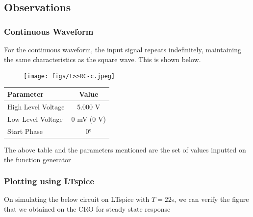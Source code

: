 \documentclass[journal]{IEEEtran}
\begin{document}
\subsection{Observations}
\subsubsection{Continuous Waveform}

For the continuous waveform, the input signal repeats indefinitely, maintaining the same characteristics as the square wave. This is shown below.

\begin{figure}[H]
    \centering
    \texttt{[image: figs/t>>RC-c.jpeg]}
\end{figure}
\begin{table}[h]
    \centering
    \renewcommand{\arraystretch}{1.3} %
    \begin{tabular}{|l|c|}
        \hline
        \textbf{Parameter} & \textbf{Value} \\
        \hline
        High Level Voltage & 5.000 V \\
        \hline
        Low Level Voltage & 0 mV (0 V) \\
        \hline
        Start Phase & 0° \\
        \hline
    \end{tabular}
\end{table}
The above table and the parameters mentioned are the set of values inputted on the function generator
\subsubsection{Plotting using LTspice}
On simulating the below circuit on LTspice with $T=22$s, we can verify the figure that we obtained on the CRO for steady state response \\
\end{document}
